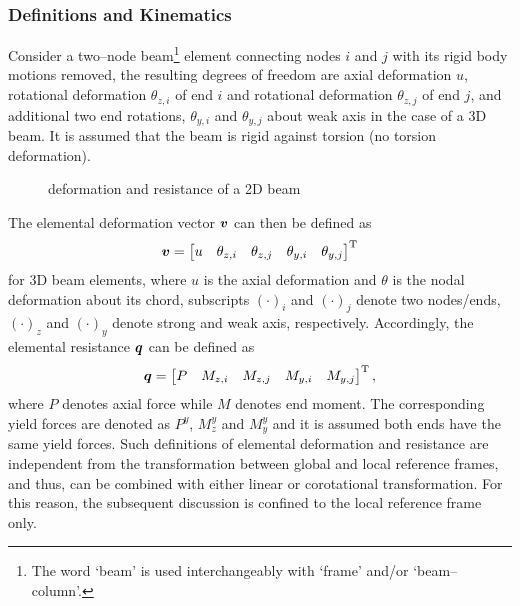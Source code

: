 \subsubsection{Definitions and Kinematics}
Consider a two--node beam\footnote{The word `beam' is used interchangeably with `frame' and/or `beam--column'.} element connecting nodes $i$ and $j$ with its rigid body motions removed, the resulting degrees of freedom are axial deformation $u$, rotational deformation $\theta_{z,i}$ of end $i$ and rotational deformation $\theta_{z,j}$ of end $j$, and additional two end rotations, $\theta_{y,i}$ and $\theta_{y,j}$ about weak axis in the case of a 3D beam.
It is assumed that the beam is rigid against torsion (no torsion deformation).
\begin{figure}[H]
\centering
{}
\caption{deformation and resistance of a 2D beam}
\end{figure}

The elemental deformation vector $\bm{v}$ can then be defined as
\begin{gather}
\bm{v}=\begin{bmatrix}
u&\theta_{z,i}&\theta_{z,j}&\theta_{y,i}&\theta_{y,j}
\end{bmatrix}^{\mathrm{T}}
\end{gather}
for 3D beam elements, where $u$ is the axial deformation and $\theta$ is the nodal deformation about its chord, subscripts $\left(\cdot\right)_i$ and $\left(\cdot\right)_j$ denote two nodes/ends, $\left(\cdot\right)_z$ and $\left(\cdot\right)_y$ denote strong and weak axis, respectively.
Accordingly, the elemental resistance $\bm{q}$ can be defined as
\begin{gather}
\bm{q}=\begin{bmatrix}
P&M_{z,i}&M_{z,j}&M_{y,i}&M_{y,j}
\end{bmatrix}^{\mathrm{T}},
\end{gather}
where $P$ denotes axial force while $M$ denotes end moment.
The corresponding yield forces are denoted as $P^y$, $M_z^y$ and $M_y^y$ and it is assumed both ends have the same yield forces.
Such definitions of elemental deformation and resistance are independent from the transformation between global and local reference frames, and thus, can be combined with either linear or corotational transformation.
For this reason, the subsequent discussion is confined to the local reference frame only.

